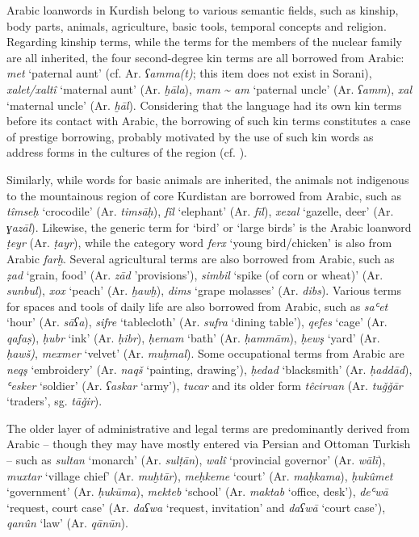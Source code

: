 \documentclass[output=paper]{langsci/langscibook}
\begin{document}
Arabic loanwords in Kurdish belong to various semantic fields, such as kinship, body parts, animals, agriculture, basic tools, temporal concepts and religion. Regarding kinship terms, while the terms for the members of the nuclear family are all inherited, the four second-degree kin terms are all borrowed from Arabic: \textit{met} ‘paternal aunt’ (cf. Ar. \textit{ʕamma(t)}; this item does not exist in Sorani), \textit{xalet/xaltî} ‘maternal aunt’ (Ar. \textit{ḫāla}), \textit{mam} \textit{{\textasciitilde} am} ‘paternal uncle’ (Ar. \textit{ʕamm}), \textit{xal} ‘maternal uncle’ (Ar. \textit{ḫāl}). Considering that the language had its own kin terms before its contact with Arabic, the borrowing of such kin terms constitutes a case of prestige borrowing, probably motivated by the use of such kin words as address forms in the cultures of the region (cf. \citealt{HaigÖpengin2015}).

Similarly, while words for basic animals are inherited, the animals not indigenous to the mountainous region of core Kurdistan are borrowed from Arabic, such as \textit{tîmseḥ} ‘crocodile’ (Ar. \textit{timsāḥ}), \textit{fîl} ‘elephant’ (Ar. \textit{fīl}), \textit{xezal} ‘gazelle, deer’ (Ar. \textit{ɣazāl}). Likewise, the generic term for ‘bird’ or ‘large birds’ is the Arabic loanword \textit{ṭeyr} (Ar. \textit{ṭayr}), while the category word \textit{ferx} ‘young bird/chicken’ is also from Arabic \textit{farḫ}. Several agricultural terms are also borrowed from Arabic, such as \textit{ẓad} ‘grain, food’ (Ar. \textit{zād} 'provisions'), \textit{simbil} ‘spike (of corn or wheat)’ (Ar. \textit{sunbul}), \textit{xox} ‘peach’ (Ar. \textit{ḫawḫ}), \textit{dims} ‘grape molasses’ (Ar. \textit{dibs}). Various terms for spaces and tools of daily life are also borrowed from Arabic, such as \textit{saʿet} ‘hour’ (Ar. \textit{sāʕa}), \textit{sifre} ‘tablecloth’ (Ar. \textit{sufra} ‘dining table’), \textit{qefes} ‘cage’ (Ar. \textit{qafaṣ}), \textit{ḥubr} ‘ink’ (Ar. \textit{ḥibr}), \textit{ḥemam} ‘bath’ (Ar. \textit{ḥammām}), \textit{ḥewş} ‘yard’ (Ar. \textit{ḥawš)}, \textit{mexmer} ‘velvet’ (Ar. \textit{muḫmal}). Some occupational terms from Arabic are \textit{neqş} ‘embroidery’ (Ar. \textit{naqš} ‘painting, drawing’), \textit{ḥedad} ‘blacksmith’ (Ar. \textit{ḥaddād}), \textit{ʿesker} ‘soldier’ (Ar. \textit{ʕaskar} ‘army’), \textit{tucar} and its older form \textit{têcirvan} (Ar. \textit{tuǧǧār} ‘traders’, sg. \textit{tāǧir}).  

The older layer of administrative and legal terms are predominantly derived from Arabic – though they may have mostly entered via Persian and Ottoman Turkish – such as \textit{sultan} ‘monarch’ (Ar. \textit{sulṭān}), \textit{walî} ‘provincial governor’ (Ar. \textit{wālī}), \textit{muxtar} ‘village chief’ (Ar. \textit{muḫtār}), \textit{meḥkeme} ‘court’ (Ar. \textit{maḥkama}), \textit{ḥukûmet} ‘government’ (Ar. \textit{ḥukūma}), \textit{mekteb} ‘school’ (Ar. \textit{maktab} ‘office, desk’), \textit{deʿwā} ‘request, court case’ (Ar. \textit{daʕwa} ‘request, invitation’ and \textit{daʕwā} ‘court case’), \textit{qanûn} ‘law’ (Ar. \textit{qānūn}).  
\end{document}
